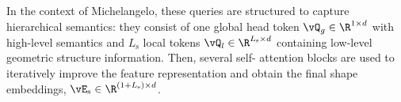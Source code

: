 \documentclass[../../book-main.tex]{subfiles}
\begin{document}
In the context of Michelangelo, these queries are structured to
capture hierarchical semantics: they consist of one global head token
$\vQ_g \in \R^{1 \times d}$ with high-level semantics and
$L_{\mathrm{s}}$ local tokens $\vQ_l \in \R^{L_{\mathrm{s}} \times d}$
containing low-level geometric structure information. Then, several self-
attention blocks are used to iteratively improve the feature
representation and obtain the final shape embeddings, $\vE_{\mathrm{s}}
\in \R^{(1+L_{\mathrm{s}}) \times d}$.


\end{document}
